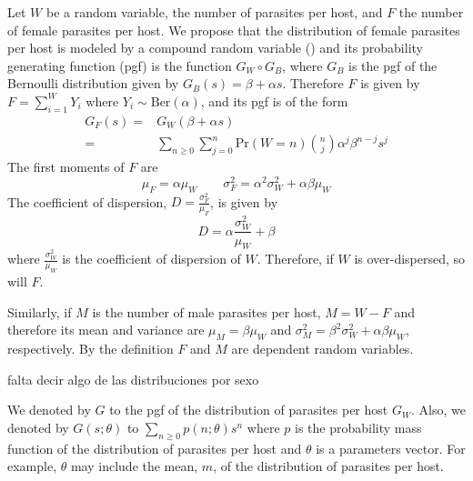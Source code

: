 \documentclass[12pt,a4paper]{article}
\theoremstyle{plain}%
\theoremstyle{definition}
\theoremstyle{remark}
\begin{document}
	Let $W$ be a random variable, the number of parasites per host, and 
	$F$ the number of female parasites per host.
	We propose that the distribution of female parasites per host is modeled by 
	a compound random variable
	(\cite{johnson2005univariate}) and its probability generating function (pgf) is the function $G_W \circ G_B$, where $G_B$  is the pgf of the Bernoulli distribution given by $G_B(s)=\beta + \alpha s$. 
	Therefore $F$ is given by $F=\sum_{i=1} ^W Y_i$ where $Y_i\sim \mathrm{Ber}(\alpha)$, and its pgf is of the form
	\begin{equation}\label{genf}
	\begin{split}
	G_F(s)=&G_W(\beta + \alpha s)\\
	=&\sum_{n\geq 0}\sum_{j=0}^{n} \mathrm{Pr}(W=n)\binom{n}{j}\alpha^j\beta^{n-j}s^j
	\end{split}
	\end{equation}
	The first moments of $F$ are
	\begin{equation}
	\mu_F=\alpha \mu_W \qquad \sigma_F^2=\alpha^2\sigma_W^2+ \alpha\beta\mu_W
	\end{equation}
	The coefficient of dispersion, $D=\frac{\sigma_F^2}{\mu_F}$, is given by \[D=\alpha\frac{\sigma_W^2}{\mu_W}+\beta\]
	where $\frac{\sigma_W^2}{\mu_W}$ 
	is the coefficient of dispersion of $W$.
	Therefore, if $W$ is over-dispersed, so will $F$. 
	
	
	Similarly, if $M$ is the number of male parasites per host,  $M = W - F$ and therefore its mean and variance are $\mu_M=\beta\mu_W$ and $\sigma_M^2=\beta^2\sigma_W^2+ \alpha\beta\mu_W$, respectively. By the definition $F$ and $M$ are dependent random variables.
	
	{\color{red}falta decir algo de las distribuciones por sexo}
	
	
	{\color{blue}
	We denoted by $G$ to the pgf of the distribution of parasites per host $G_W$. Also, we denoted by $G(s;\theta)$ to $\sum_{n\geq 0}p(n;\theta)s^{n}$ 
	where $p$ is the probability mass function of the distribution of parasites per host and $\theta$ is a parameters vector. For example, $\theta$ may include the mean, $m$, %
	of the distribution of parasites per host.
	}
	
	
	
	
	
	
	
\end{document}
